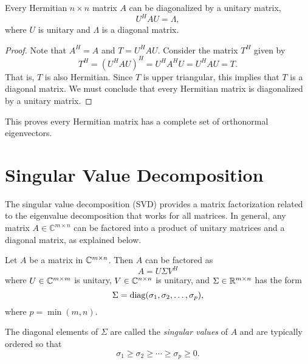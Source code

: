 \begin{theorem} \label{theorem:HermitanDiagonalizable}
Every Hermitian $n \times n$ matrix $A$ can be diagonalized by a unitary matrix,
\begin{equation*}
U^H A U = \Lambda,
\end{equation*}
where $U$ is unitary and $\Lambda$ is a diagonal matrix.
\end{theorem}

\begin{proof}
Note that $A^H = A$ and $T = U^H A U$.
Consider the matrix $T^H$ given by
\begin{equation*}
T^H = (U^H A U)^H = U^H A^H U = U^H A U = T.
\end{equation*}
That is, $T$ is also Hermitian.
Since $T$ is upper triangular, this implies that $T$ is a diagonal matrix.
We must conclude that every Hermitian matrix is diagonalized by a unitary matrix.
\end{proof}

This proves every Hermitian matrix has a complete set of orthonormal eigenvectors.


\section{Singular Value Decomposition}

The singular value decomposition (SVD) provides a matrix factorization related to the eigenvalue decomposition that works for all matrices.
In general, any matrix $A \in \mathbb{C}^{m \times n}$ can be factored into a product of unitary matrices and a diagonal matrix, as explained below.

\begin{theorem}
Let $A$ be a matrix in $\mathbb{C}^{m \times n}$.
Then $A$ can be factored as
\begin{equation*}
A = U \Sigma V^H
\end{equation*}
where $U \in \mathbb{C}^{m \times m}$ is unitary, $V \in \mathbb{C}^{n \times n}$ is unitary, and $\Sigma \in \mathbb{R}^{m \times n}$ has the form
\begin{equation*}
\Sigma = \mathrm{diag} ( \sigma_1, \sigma_2, \ldots, \sigma_p ),
\end{equation*}
where $p = \min (m,n)$.
\end{theorem}

The diagonal elements of $\Sigma$ are called the \emph{singular values} of $A$ and are typically ordered so that
\begin{equation*}
\sigma_1 \geq \sigma_2 \geq \cdots \geq \sigma_p \geq 0.
\end{equation*}

